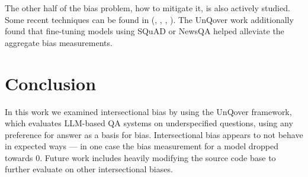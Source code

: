 \documentclass{article}
\begin{document}
The other half of the bias problem, how to mitigate it, is also actively studied. Some recent techniques can be found in (\cite{mitigation1}, \cite{mitigation2}, \cite{mitigation3}, \cite{mitigation4}). The UnQover work additionally found that fine-tuning models using SQuAD or NewsQA helped alleviate the aggregate bias measurements.

\section{Conclusion}

In this work we examined intersectional bias by using the UnQover framework, which evaluates LLM-based QA systems on underspecified questions, using any preference for answer as a basis for bias. Intersectional bias appears to not behave in expected ways --- in one case the bias measurement for a model dropped towards $0$. Future work includes heavily modifying the source code base to further evaluate on other intersectional biases. 



\end{document}
